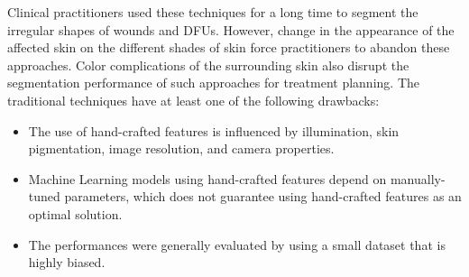\documentclass[review]{elsarticle}
\begin{document}
\newline\indent Clinical practitioners used these techniques for a long time to segment the irregular shapes of wounds and DFUs. However, change in the appearance of the affected skin on the different shades of skin force practitioners to abandon these approaches. Color complications of the surrounding skin also disrupt the segmentation performance of such approaches for treatment planning. The traditional techniques have at least one of the following drawbacks:
\begin{itemize}
	\item The use of hand-crafted features is influenced by illumination, skin pigmentation, image resolution, and camera properties.
	\item Machine Learning models using hand-crafted features depend on manually-tuned parameters, which does not guarantee using hand-crafted features as an optimal solution.
	\item The performances were generally evaluated by using a small dataset that is highly biased.
\end{itemize}
\end{document}
